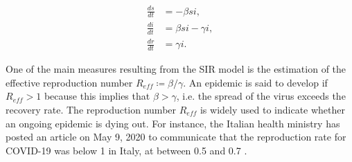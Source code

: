 \documentclass[12pt]{article}
\begin{document}
	\begin{align}
    	\frac{ds}{dt} &= -\beta si, \label{eq:SIR_model_S_prop}\\
    	\frac{di}{dt} &= \beta si - \gamma i, \label{eq:SIR_model_I_prop}\\
    	\frac{dr}{dt} &= \gamma i. \label{eq:SIR_model_R_prop}
	\end{align}
	
	One of the main measures resulting from the SIR model is the estimation of the effective reproduction number $R_{eff} \coloneqq \beta / \gamma$. An epidemic is said to develop if $R_{eff} > 1$ because this implies that $\beta > \gamma$, i.e. the spread of the virus exceeds the recovery rate. The reproduction number $R_{eff}$ is widely used to indicate whether an ongoing epidemic is dying out. For instance, the Italian health ministry has posted an article on May 9, 2020 to communicate that the reproduction rate for COVID-19 was below 1 in Italy, at between 0.5 and 0.7 \parencite{saluteR0}.
	
	
\end{document}
